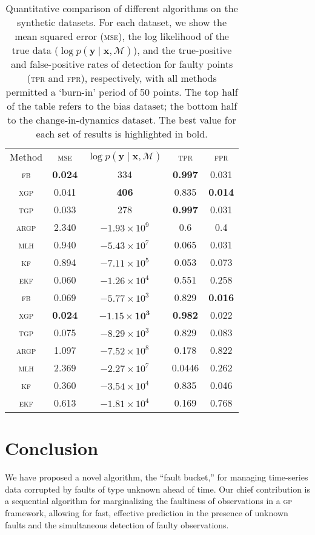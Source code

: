 \documentclass{article}
\newcommand{\given}{\ensuremath{\mid}}
\newcommand{\cm}[1]{\ensuremath{\mathcal{#1}}}
\newcommand{\bm}[1]{\ensuremath{\mathbf{#1}}}
\newcommand{\acro}[1]{\textsc{#1}}
\begin{document}
\begin{table}
  \centering
  \caption{Quantitative comparison of different algorithms on the
    synthetic datasets.  For each dataset, we show the mean squared error
    (\textsc{mse}), the log likelihood of the true data ($\log p(\bm{y}
    \given \bm{x}, \cm{M})$), and the true-positive and false-positive rates
    of detection for faulty points (\textsc{tpr} and \textsc{fpr}),
    respectively, with all methods permitted a `burn-in' period of 50 points.  The top half of the table refers to the
    bias dataset; the bottom half to the change-in-dynamics
    dataset. The best value for each set of results is highlighted in
    bold.}
  \label{tbl:results}
  \begin{tabular}{ccccc}
    \toprule
    Method & \scshape{mse} & $\log p(\bm{y} \given \bm{x}, \cm{M})$ & \scshape{tpr} & \scshape{fpr} \\
    \cmidrule{1-1} \cmidrule(l){2-5} 
    \scshape{fb} & \textbf{0.024} & 334 & \textbf{0.997} & 0.031 \\
    \scshape{xgp} & 0.041 & \textbf{406} & 0.835 & \textbf{0.014} \\
    \scshape{tgp} & 0.033 & 278 & \textbf{0.997} & 0.031 \\
    \scshape{argp} & 2.340 & $-1.93 \times 10^9$ & 0.6 & 0.4 \\
    \scshape{mlh} & 0.940 & $-5.43\times 10^7$ & 0.065 & 0.031 \\
    \scshape{kf} & 0.894 & $-7.11 \times 10^5$ & 0.053 & 0.073 \\
   \scshape{ekf} & 0.060 & $-1.26 \times 10^4$ & 0.551 & 0.258 \\
    \midrule
    \scshape{fb} & 0.069 & $-5.77\times 10^3$ & 0.829 & \textbf{0.016} \\
    \scshape{xgp} & \textbf{0.024} & $\mathbf{-1.15 \times 10^3}$ & \textbf{0.982} & 0.022 \\
    \scshape{tgp} & 0.075 & $-8.29\times 10^3$ & 0.829 & 0.083 \\
    \scshape{argp} & 1.097 & $-7.52\times 10^8$ & 0.178 & 0.822 \\
    \scshape{mlh} & 2.369 & $-2.27\times 10^7$ & 0.0446 & 0.262 \\
    \scshape{kf} & 0.360 & $-3.54 \times 10^4$ & 0.835 & 0.046 \\
   \scshape{ekf} & 0.613 & $-1.81\times 10^4$ & 0.169 & 0.768 \\
    \bottomrule
  \end{tabular}
\end{table}

\section{Conclusion}
We have proposed a novel algorithm, the ``fault bucket,'' for managing
time-series data corrupted by faults of type unknown ahead of time. Our chief
contribution is a sequential algorithm for marginalizing the
faultiness of observations in a \acro{gp} framework, allowing for
fast, effective prediction in the presence of unknown faults and the
simultaneous detection of faulty observations.



\end{document}
